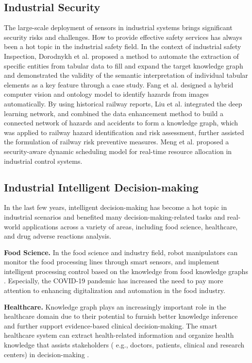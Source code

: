 \documentclass[11pt]{article}
\begin{document}
\subsection{Industrial Security}
\par{The large-scale deployment of sensors in industrial systems brings significant security risks and challenges.
How to provide effective safety services has always been a hot topic in the industrial safety field.
In the context of industrial safety Inspection, Dorodnykh et al. \cite{bib46} proposed a method to automate the extraction of specific entities from tabular data to fill and expand the target knowledge graph and demonstrated the validity of the semantic interpretation of individual tabular elements as a key feature through a case study.
Fang et al.
\cite{bib47} designed a hybrid computer vision and ontology model to identify hazards from images automatically.
By using historical railway reports, Liu et al. \cite{bib48} integrated the deep learning network, and combined the data enhancement method to build a connected network of hazards and accidents to form a knowledge graph, which was applied to railway hazard identification and risk assessment, further assisted the formulation of railway risk preventive measures.
Meng et al. \cite{bib49} proposed a security-aware dynamic scheduling model for real-time resource allocation in industrial control systems.}


\subsection{Industrial Intelligent Decision-making}
\par{In the last few years, intelligent decision-making has become a hot topic in industrial scenarios and benefited many decision-making-related tasks and real-world applications across a variety of areas\cite{bibgk}, including food science, healthcare, and drug adverse reactions analysis. }

\par{\textbf{Food Science.}
In the food science and industry field, robot manipulators can monitor the food processing lines through smart sensors, and implement intelligent processing control based on the knowledge from food knowledge graphs \cite{bib50, bib51}.
Especially, the COVID-19 pandemic has increased the need to pay more attention to enhancing digitalization and automation in the food industry.}

\par{\textbf{Healthcare.}
Knowledge graph plays an increasingly important role in the healthcare domain due to their potential to furnish better knowledge inference and further support evidence-based clinical decision-making.
The smart healthcare system can extract health-related information and organize health knowledge that assists stakeholders ( e.g., doctors, patients, clinical and research centers) in decision-making \cite{bib52, bib53}.}
\end{document}
